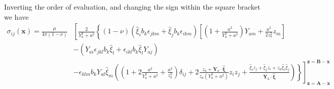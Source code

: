 \documentclass[10pt]{report}
\begin{document}
{%
Inverting the order of evaluation, and changing the sign within the square bracket we have
\begin{align}
\sigma_{ij}(\bm x)
=\frac{\mu}{4\pi(1-\nu)}&\left[\frac{2}{Y_a^2+a^2}\left\{(1-\nu)\left(\hat{\xi}_ib_k\epsilon_{jkm}+\hat{\xi}_jb_k\epsilon_{ikm}\right)\left[\left(1+\frac{a^2}{Y_a^2+a^2}\right)Y_{am}+\frac{a^2}{2z_a^2 }z_m\right]\right.\right.\nonumber\\
&-(Y_{ai}\epsilon_{jkl}b_k\hat{\xi}_l+\epsilon_{ikl}b_k\hat{\xi}_lY_{aj})\nonumber\\
&\left.\left.-\epsilon_{klm}b_kY_{al}\hat{\xi}_m\left(\left(1+2\frac{a^2}{Y_a^2+a^2}+\frac{a^2}{z_a^2 }\right)\delta_{ij}+2\frac{z_a+\bm Y_a\cdot \hat{\bm \xi}}{z_a(Y_a^2+a^2)}z_iz_j+\frac{\hat{\xi}_iz_j+\hat{\xi}_jz_i+z_a\hat{\xi}_i\hat{\xi}_j}{\bm Y_a\cdot \hat{\bm \xi}}\right)
\right\}\right]^{\bm z=\bm B-\bm x}_{\bm z=\bm A-\bm x}
%
\end{align}

}
\end{document}

